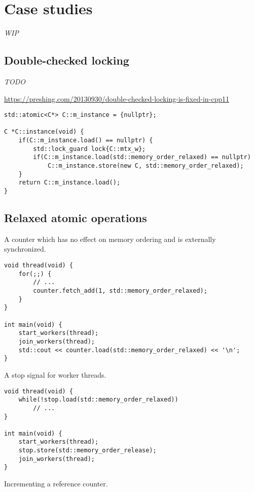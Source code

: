 \section{Case studies}

\textit{WIP}

\subsection{Double-checked locking}

\textit{TODO}

\url{https://preshing.com/20130930/double-checked-locking-is-fixed-in-cpp11}

\begin{lstlisting}[style=c++]
std::atomic<C*> C::m_instance = {nullptr};

C *C::instance(void) {
    if(C::m_instance.load() == nullptr) {
        std::lock_guard lock{C::mtx_w};
        if(C::m_instance.load(std::memory_order_relaxed) == nullptr)
            C::m_instance.store(new C, std::memory_order_relaxed);
    }
    return C::m_instance.load();
}
\end{lstlisting}

\subsection{Relaxed atomic operations}

A counter which has no effect on memory ordering and is externally synchronized.

\begin{lstlisting}[style=c++]
void thread(void) {
    for(;;) {
        // ...
        counter.fetch_add(1, std::memory_order_relaxed);
    }
}

int main(void) {
    start_workers(thread);
    join_workers(thread);
    std::cout << counter.load(std::memory_order_relaxed) << '\n';
}
\end{lstlisting}

A stop signal for worker threads.

\begin{lstlisting}[style=c++]
void thread(void) {
    while(!stop.load(std::memory_order_relaxed))
        // ...
}

int main(void) {
    start_workers(thread);
    stop.store(std::memory_order_release);
    join_workers(thread);
}
\end{lstlisting}

Incrementing a reference counter.

